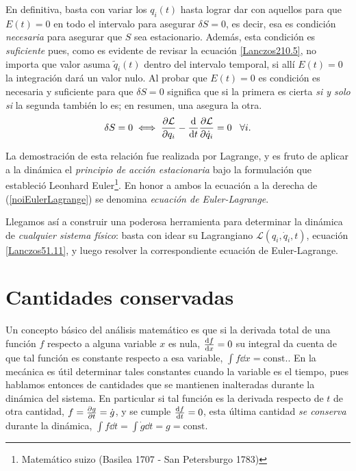 \documentclass[12pt, spanish, a4paper, ]{article}
\begin{document}
{En definitiva, basta con variar los \(q_i(t)\) hasta lograr dar con aquellos para que \(E(t)=0\) en todo el intervalo para asegurar \(\delta S=0\), es decir, esa es condición \emph{necesaria} para asegurar que \(S\) sea estacionario.
Además, esta condición es \emph{suficiente} pues, como es evidente de revisar la ecuación \eqref{Lanczos210.5}, no importa que valor asuma \(\tilde{q}_i (t)\) dentro del intervalo temporal, si allí \(E(t)=0 \) la integración dará un valor nulo.
Al probar que \(E(t)=0\) es condición es necesaria y suficiente para que \(\delta S=0\) significa que si la primera es cierta \emph{si y solo si} la segunda también lo es; 
en resumen, una asegura la otra.
}
\begin{equation}
	\delta S=0 \iff \pdv{\mathcal{L}}{q_i} - \dv{t} \pdv{\mathcal{L}}{\dot{q}_i}= 0 \; \; \; \forall i.
    \label{noiEulerLagrange}
\end{equation}

La demostración de esta relación fue realizada por Lagrange, y es fruto de aplicar a la dinámica el \emph{principio de acción estacionaria} bajo la formulación que estableció Leonhard Euler\footnote{Matemático suizo (Basilea 1707 - San Petersburgo 1783)}. 
En honor a ambos la ecuación a la derecha de (\ref{noiEulerLagrange}) se denomina \emph{ecuación de Euler-Lagrange}.

Llegamos así a construir una poderosa herramienta para determinar la dinámica de \emph{cualquier sistema físico}:
basta con idear su Lagrangiano \(\mathcal{L}(q_i, \dot{q}_i, t)\), ecuación \eqref{Lanczos51.11}, y luego resolver la correspondiente ecuación de Euler-Lagrange.


\section{Cantidades conservadas}
Un concepto básico del análisis matemático es que si la derivada total de una función \(f\) respecto a alguna variable \(x\) es nula, \(\dv{f}{x}=0\) su integral da cuenta de que tal función es constante respecto a esa variable, \(\int f \dd x= \mathrm{const.}\).
En la mecánica es útil determinar tales constantes cuando la variable es el tiempo, pues hablamos entonces de cantidades que se mantienen inalteradas durante la dinámica del sistema.
En particular si tal función es la derivada respecto de \(t\) de otra cantidad, \(f= \pdv{g}{t}= \dot{g}\), y se cumple \(\dv{f}{t}=0\), esta última cantidad \emph{se conserva} durante la dinámica, \(\int f \dd t= \int \dot{g} \dd t= g= \mathrm{const.}\) 
\end{document}
